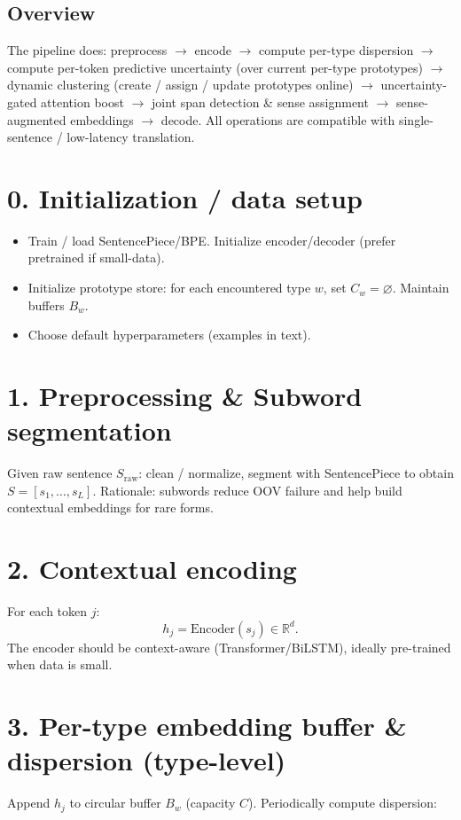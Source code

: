 \documentclass[a4paper,12pt]{article}
\begin{document}
\subsection*{Overview}
The pipeline does: preprocess $\rightarrow$ encode $\rightarrow$ compute per-type dispersion $\rightarrow$ compute per-token predictive uncertainty (over current per-type prototypes) $\rightarrow$ dynamic clustering (create / assign / update prototypes online) $\rightarrow$ uncertainty-gated attention boost $\rightarrow$ joint span detection \& sense assignment $\rightarrow$ sense-augmented embeddings $\rightarrow$ decode. All operations are compatible with single-sentence / low-latency translation.

\section*{0. Initialization / data setup}
\begin{itemize}
    \item Train / load SentencePiece/BPE. Initialize encoder/decoder (prefer pretrained if small-data).
    \item Initialize prototype store: for each encountered type $w$, set $C_w = \varnothing$. Maintain buffers $B_w$.
    \item Choose default hyperparameters (examples in text).
\end{itemize}

\section*{1. Preprocessing \& Subword segmentation}
Given raw sentence $S_{\text{raw}}$: clean / normalize, segment with SentencePiece to obtain $S = [s_1, \ldots, s_L]$. Rationale: subwords reduce OOV failure and help build contextual embeddings for rare forms.

\section*{2. Contextual encoding}
For each token $j$:
\[
h_j = \text{Encoder}(s_j) \in \mathbb{R}^d.
\]
The encoder should be context-aware (Transformer/BiLSTM), ideally pre-trained when data is small.

\section*{3. Per-type embedding buffer \& dispersion (type-level)}
Append $h_j$ to circular buffer $B_w$ (capacity $C$). Periodically compute dispersion:
\end{document}
